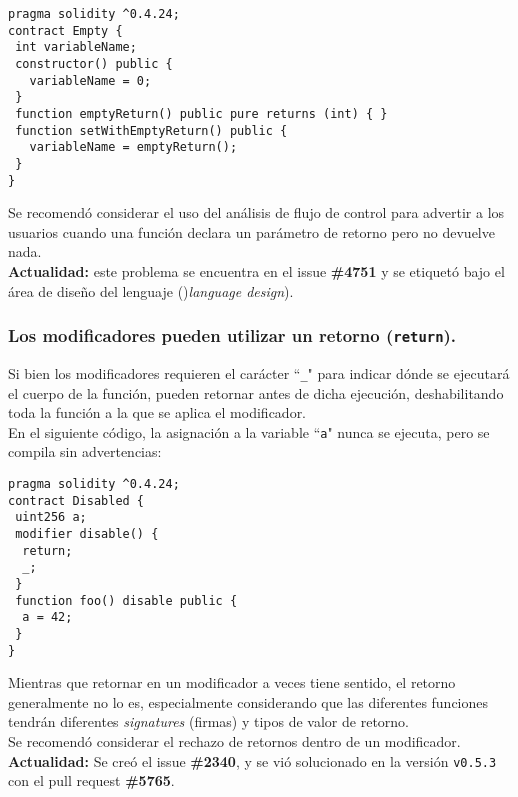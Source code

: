 \begin{lstlisting}[language=Solidity, caption={Código de ejemplo con return vacío.}]
pragma solidity ^0.4.24;
contract Empty {
 int variableName;
 constructor() public {
   variableName = 0;
 }
 function emptyReturn() public pure returns (int) { }
 function setWithEmptyReturn() public {
   variableName = emptyReturn();
 }
}
\end{lstlisting}

Se recomendó considerar el uso del análisis de flujo de control para advertir a los usuarios cuando una función declara un parámetro de retorno pero no devuelve nada.\\

\textbf{Actualidad:} este problema se encuentra en el issue \textbf{\#4751}\cite{GHI4751} y se etiquetó bajo el área de diseño del lenguaje ()\textit{language design}).\\

\subsubsection{Los modificadores pueden utilizar un retorno (\texttt{return}).}

Si bien los modificadores requieren el carácter ``\texttt{\_}" para indicar dónde se ejecutará el cuerpo de la función, pueden retornar antes de dicha ejecución, deshabilitando toda la función a la que se aplica el modificador.\\

En el siguiente código, la asignación a la variable ``\texttt{a}" nunca se ejecuta, pero se compila sin advertencias:
\begin{lstlisting}[language=Solidity, caption={Código de ejemplo para modificador con retorno}]
pragma solidity ^0.4.24;
contract Disabled {
 uint256 a;
 modifier disable() {
  return;
  _;
 }
 function foo() disable public {
  a = 42;
 }
}
\end{lstlisting}

Mientras que retornar en un modificador a veces tiene sentido, el retorno generalmente no lo es, especialmente considerando que las diferentes funciones tendrán diferentes \textit{signatures} (firmas) y tipos de valor de retorno.\\

Se recomendó considerar el rechazo de retornos dentro de un modificador.\\

\textbf{Actualidad:} Se creó el issue \textbf{\#2340}\cite{GHI2340}, y se vió solucionado en la versión \texttt{v0.5.3} con el pull request \textbf{\#5765}\cite{GHPR5765}.\\


